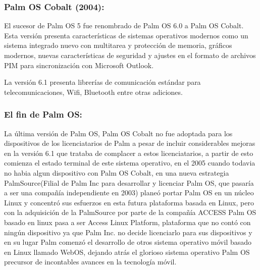 \subsubsection*{Palm OS Cobalt (2004):}
El sucesor de Palm OS 5 fue renombrado de Palm OS 6.0 a Palm OS Cobalt. Esta versión presenta características de sistemas operativos modernos como un sistema integrado nuevo con 
multitarea y protección de memoria, gráficos modernos, nuevas características de seguridad y ajustes en el formato de archivos PIM para sincronización con Microsoft Outlook.

La versión 6.1 presenta librerías de comunicación estándar para telecomunicaciones, Wifi, Bluetooth entre otras adiciones.

\subsubsection*{El fin de Palm OS:}
La última versión de Palm OS, Palm OS Cobalt no fue adoptada para los dispositivos de los licenciatarios de Palm a pesar de incluir considerables mejoras en la versión 6.1 que 
trataba de complacer a estos licenciatarios, a partir de esto comienza el estado terminal de este sistema operativo, en el 2005 cuando todavia no habia algun dispositivo con Palm 
OS Cobalt, en una nueva estrategia PalmSource(Filial de Palm Inc para desarrollar y licenciar Palm OS, que pasaría a ser una compañía independiente en 2003) planeó portar Palm OS 
en un núcleo Linux y concentró sus esfuerzos en esta futura plataforma basada en Linux, pero con la adquisición de la PalmSource por parte de la compañía ACCESS Palm OS basado en 
linux pasa a ser Access Linux Platform, plataforma que no contó con ningún dispositivo ya que Palm Inc. no decide licenciarlo para sus dispositivos y en su lugar Palm comenzó el 
desarrollo de otros sistema operativo móvil basado en Linux llamado WebOS, dejando atrás el glorioso sistema operativo Palm OS precursor de incontables avances en la tecnología 
móvil.


